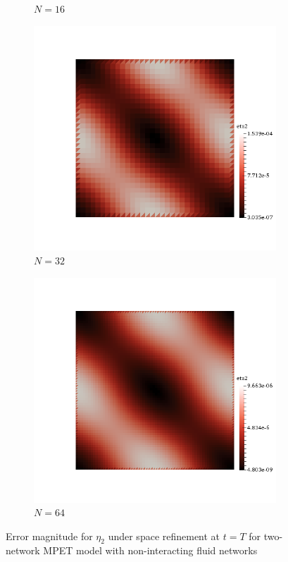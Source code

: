 \begin{figure}[h!]
\begin{subfigure}[b]{0.24\textwidth}
    \caption{$N=16$}
  \end{subfigure}
  \begin{subfigure}[b]{0.24\textwidth}
    \includegraphics[width=\textwidth,height=\textheight,keepaspectratio,height=\textheight,keepaspectratio]{figures/2_mpet/no_transfer/space/eta2_32.png}
    \caption{$N=32$}
  \end{subfigure}
  \begin{subfigure}[b]{0.24\textwidth}
    \includegraphics[width=\textwidth,height=\textheight,keepaspectratio,height=\textheight,keepaspectratio]{figures/2_mpet/no_transfer/space/eta2_64.png}
    \caption{$N=64$}
  \end{subfigure}
  \caption{Error magnitude for $\eta_2$ under space refinement at $t=T$ for two-network MPET model with non-interacting fluid networks} \label{fig:bb_no_transfer_eta2}
\end{figure}
